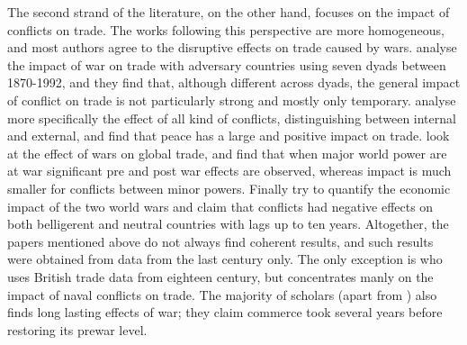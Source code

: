 \documentclass[12pt,a4paper,notitlepage,english]{article}
\begin{document}
The second strand of the literature, on the other hand, focuses on the impact of conflicts on trade. The works following this perspective are more homogeneous, and most authors agree to the disruptive effects on trade caused by wars. \cite{levy2004trading} analyse the impact of war on trade with adversary countries using seven dyads between 1870-1992, and they find that, although different across dyads, the general impact of conflict on trade is not particularly strong and mostly only temporary. \cite{blomberg2006much} analyse more specifically the effect of all kind of conflicts, distinguishing between internal and external, and find that peace has a large and positive impact on trade. \cite{anderton2001impact} look at the effect of wars on global trade, and find that when major world power are at war significant pre and post war effects are observed, whereas impact is much smaller for conflicts between minor powers. Finally \cite{glick2010collateral} try to quantify the economic impact of the two world wars and claim that conflicts had negative effects on both belligerent and neutral countries with lags up to ten years. Altogether, the papers mentioned above do not always find coherent results, and such results were obtained from data from the last century only. The only exception is \cite{rahman2010fighting} who uses British trade data from eighteen century, but concentrates manly on the impact of naval conflicts on trade. The majority of scholars (apart from \cite{levy2004trading}) also finds long lasting effects of war; they claim commerce took several years before restoring its prewar level.\\
\end{document}
